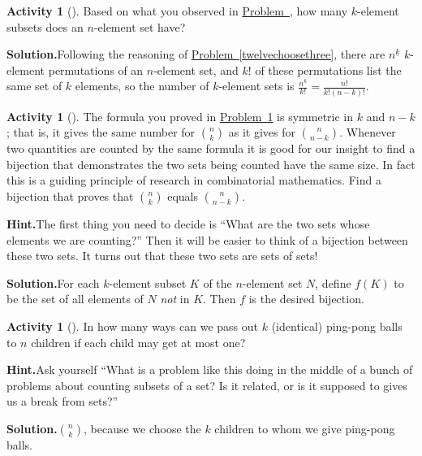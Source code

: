 \documentclass[10pt,]{book}
\theoremstyle{plain}
\theoremstyle{definition}
\newtheorem{activity}[project]{Activity}
\numberwithin{equation}{chapter}
\begin{document}
\begin{activity}[]\label{nchoosek}
Based on what you observed in \hyperref[twelvechoosethreefinal]{Problem~}, how many \(k\)-element subsets does an \(n\)-element set have?%
\par\medskip\noindent%
\textbf{Solution.}\quad Following the reasoning of \hyperref[twelvechoosethree]{Problem~\ref{twelvechoosethree}}, there are \(n^{\underline{k}}\) \(k\)-element permutations of an \(n\)-element set, and \(k!\) of these permutations list the same set of \(k\) elements, so the number of \(k\)-element sets is \(\frac{n^{\underline{k}}}{k!}= \frac{n!}{k!(n-k)!}\).%
\end{activity}
\begin{activity}[]\label{activity-36}
The formula you proved in \hyperref[nchoosek]{Problem~\ref{nchoosek}} is symmetric in \(k\) and \(n-k\); that is, it gives the same number for \(\binom{n}{k}\) as it gives for \(\binom{n}{n-k}\). Whenever two quantities are counted by the same formula it is good for our insight to find a bijection that demonstrates the two sets being counted have the same size. In fact this is a guiding principle of research in combinatorial mathematics. Find a bijection that proves that \(\binom{n}{k}\) equals \(\binom{n}{n-k}\).%
\par\medskip\noindent%
\textbf{Hint.}\quad The first thing you need to decide is ``What are the two sets whose elements we are counting?'' Then it will be easier to think of a bijection between these two sets. It turns out that these two sets are sets of sets!%
\par\medskip\noindent%
\textbf{Solution.}\quad For each \(k\)-element subset \(K\) of the \(n\)-element set \(N\), define \(f(K)\) to be the set of all elements of \(N\) \emph{not} in \(K\). Then \(f\) is the desired bijection.%
\end{activity}
\begin{activity}[]\label{ping-pong}
In how many ways can we pass out \(k\) (identical) ping-pong balls to \(n\) children if each child may get at most one?%
\par\medskip\noindent%
\textbf{Hint.}\quad Ask yourself ``What is a problem like this doing in the middle of a bunch of problems about counting subsets of a set? Is it related, or is it supposed to gives us a break from sets?''%
\par\medskip\noindent%
\textbf{Solution.}\quad \(\binom{n}{k}\), because we choose the \(k\) children to whom we give ping-pong balls.%
\end{activity}
\end{document}
